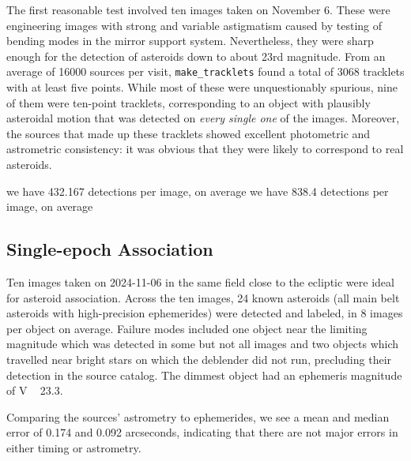 The first reasonable test involved ten images taken on November 6. These were engineering images with strong and variable astigmatism caused by testing of bending modes in the mirror support system. Nevertheless, they were sharp enough for the detection of asteroids down to about 23rd magnitude. From an average of 16000 sources per visit, {\tt make\_tracklets} found a total of 3068 tracklets with at least five points. While most of these were unquestionably spurious, nine of them were ten-point tracklets, corresponding to an object with plausibly asteroidal motion that was detected on {\em every single one} of the images. Moreover, the sources that made up these tracklets showed excellent photometric and astrometric consistency: it was obvious that they were likely to correspond to real asteroids. 


we have 432.167 detections per image, on average
we have 838.4 detections per image, on average


\subsection{Single-epoch Association}
\label{sec:association}

Ten images taken on 2024-11-06 in the same field close to the ecliptic were ideal for asteroid association. Across the ten images, 24 known asteroids (all main belt asteroids with high-precision ephemerides) were detected and labeled, in 8 images per object on average. Failure modes included one object near the limiting magnitude which was detected in some but not all images and two objects which travelled near bright stars on which the deblender did not run, precluding their detection in the source catalog. The dimmest object had an ephemeris magnitude of V ~ 23.3. 

Comparing the sources' astrometry to ephemerides,  we see a mean and median error of 0.174 and 0.092 arcseconds, indicating that there are not major errors in either timing or astrometry.


